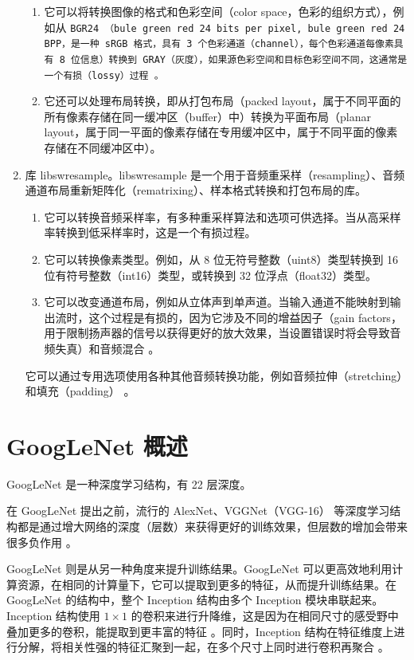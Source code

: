 \begin{enumerate}
\begin{enumerate}
        \item 它可以将转换图像的格式和色彩空间（color space，色彩的组织方式），例如从 \tt{BGR24} （bule green red 24 bits per pixel, bule green red 24 BPP，是一种 sRGB 格式，具有 3 个色彩通道（channel），每个色彩通道每像素具有 8 位信息）转换到 \tt{GRAY}（灰度），如果源色彩空间和目标色彩空间不同，这通常是一个有损（lossy）过程 \cite{bgr24}。
        \item 它还可以处理布局转换，即从打包布局（packed layout，属于不同平面的所有像素存储在同一缓冲区（buffer）中）转换为平面布局（planar layout，属于同一平面的像素存储在专用缓冲区中，属于不同平面的像素存储在不同缓冲区中）。
    \end{enumerate}
    \item 库 libswresample。libswresample 是一个用于音频重采样（resampling）、音频通道布局重新矩阵化（rematrixing）、样本格式转换和打包布局的库。
    \begin{enumerate}
        \item 它可以转换音频采样率，有多种重采样算法和选项可供选择。当从高采样率转换到低采样率时，这是一个有损过程。
        \item 它可以转换像素类型。例如，从 8 位无符号整数（uint8）类型转换到 16 位有符号整数（int16）类型，或转换到 32 位浮点（float32）类型。
        \item 它可以改变通道布局，例如从立体声到单声道。当输入通道不能映射到输出流时，这个过程是有损的，因为它涉及不同的增益因子（gain factors，用于限制扬声器的信号以获得更好的放大效果，当设置错误时将会导致音频失真）和音频混合 \cite{gain}。
    \end{enumerate}
    它可以通过专用选项使用各种其他音频转换功能，例如音频拉伸（stretching）和填充（padding） 。
\end{enumerate}

\section{GoogLeNet 概述}

GoogLeNet 是一种深度学习结构，有 22 层深度。

在 GoogLeNet 提出之前，流行的 AlexNet、VGGNet（VGG-16） 等深度学习结构都是通过增大网络的深度（层数）来获得更好的训练效果，但层数的增加会带来很多负作用 \cite{alexnet} \cite{vgg}。

GoogLeNet 则是从另一种角度来提升训练结果。GoogLeNet 可以更高效地利用计算资源，在相同的计算量下，它可以提取到更多的特征，从而提升训练结果。在 GoogLeNet 的结构中，整个 Inception 结构由多个 Inception 模块串联起来。Inception 结构使用 $1\times1$ 的卷积来进行升降维，这是因为在相同尺寸的感受野中叠加更多的卷积，能提取到更丰富的特征 \cite{nin}。同时，Inception 结构在特征维度上进行分解，将相关性强的特征汇聚到一起，在多个尺寸上同时进行卷积再聚合 \cite{ggnet1}。

